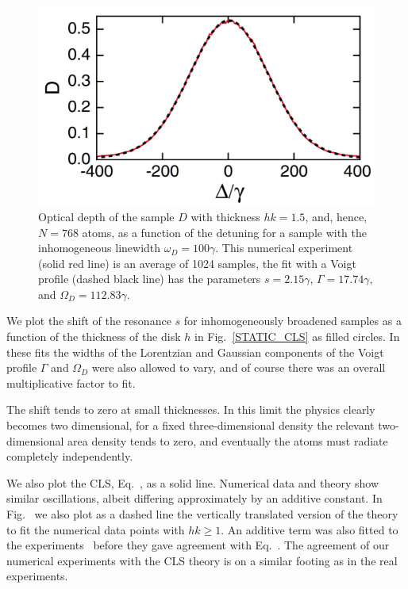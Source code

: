 \begin{figure}[h!]
\begin{center}
\includegraphics[width=\textwidth]{inhomo_D.pdf}
\end{center}
\caption{Optical depth of the sample $D$ with thickness $hk=1.5$, and, hence, $N=768$ atoms, as a function of the detuning for a sample with the inhomogeneous linewidth $\omega_D=100\gamma$. This numerical experiment (solid red line) is an average of 1024 samples, the fit with a Voigt profile (dashed black line) has the parameters $s=2.15\gamma$, $\Gamma=17.74\gamma$, and $\Omega_D=112.83\gamma$.}
\label{INHOMO_D}
\end{figure}

We plot the shift of the resonance $s$ for inhomogeneously broadened samples as a function of the thickness of the disk $h$ in Fig.~\ref{STATIC_CLS} as filled circles.  In these fits the widths of the Lorentzian and Gaussian components of the Voigt profile $\Gamma$ and $\Omega_D$ were also allowed to vary, and of course there was an overall multiplicative factor to fit.

The shift tends to zero at small thicknesses. In this limit the physics clearly becomes two dimensional, for a fixed three-dimensional density the relevant two-dimensional area density tends to zero, and eventually the atoms must radiate completely independently. 

We also plot the CLS, Eq.~, as a solid line. Numerical data and theory show similar oscillations, albeit differing approximately by an additive constant. In Fig.~ we also plot as a dashed line the vertically translated version of the theory to fit the numerical data points with $hk\geq 1$. An additive term was also fitted to the experiments~\cite{PhysRevLett.108.173601} before they gave agreement with Eq.~. The agreement of our numerical experiments with the CLS theory is on a similar footing as in the real experiments.


